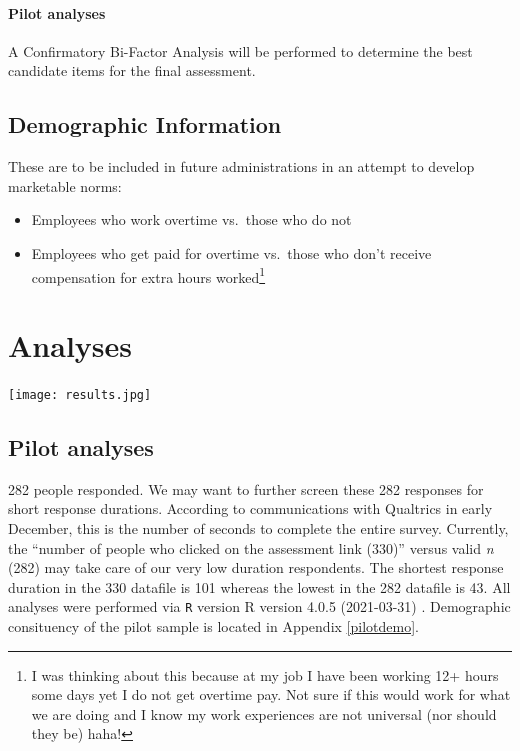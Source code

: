 \documentclass[
]{book}
\providecommand{\tightlist}{%
  \setlength{\itemsep}{0pt}\setlength{\parskip}{0pt}}
\begin{document}
\hypertarget{pilot-analyses}{%
\subsubsection{Pilot analyses}\label{pilot-analyses}}

A Confirmatory Bi-Factor Analysis will be performed to determine the best candidate items for the final assessment.

\hypertarget{demographic-information}{%
\section{Demographic Information}\label{demographic-information}}

These are to be included in future administrations in an attempt to develop marketable norms:

\begin{itemize}
\tightlist
\item
  Employees who work overtime vs.~those who do not
\item
  Employees who get paid for overtime vs.~those who don't receive compensation for extra hours worked\footnote{I was thinking about this because at my job I have been working 12+ hours some days yet I do not get overtime pay. Not sure if this would work for what we are doing and I know my work experiences are not universal (nor should they be) haha!}
\end{itemize}

\hypertarget{analyses}{%
\chapter{Analyses}\label{analyses}}

\texttt{[image: results.jpg]}

\hypertarget{pilot-analyses-1}{%
\section{Pilot analyses}\label{pilot-analyses-1}}

282 people responded. We may want to further screen these 282 responses for short response durations. According to communications with Qualtrics in early December, this is the number of seconds to complete the entire survey. Currently, the ``number of people who clicked on the assessment link (330)'' versus valid \emph{n} (282) may take care of our very low duration respondents. The shortest response duration in the 330 datafile is 101 whereas the lowest in the 282 datafile is 43. All analyses were performed via \texttt{R} version R version 4.0.5 (2021-03-31) \citep{R-base}. Demographic consituency of the pilot sample is located in Appendix \ref{pilotdemo}.
\end{document}

